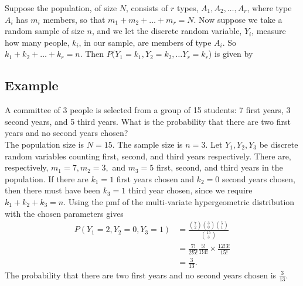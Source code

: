 \noindent Suppose the population, of size $N$, consists of $r$ types, $A_1, A_2,\ldots, A_r$, where type $A_i$ has $m_i$ members, so that $m_1 + m_2 + \ldots + m_r = N$. Now suppose we take a random sample of size $n$, and we let the discrete random variable, $Y_i$, measure how many people, $k_i$, in our sample, are members of type $A_i$. So $k_1 + k_2 + \ldots + k_r = n$. Then $P(Y_1 = k_1, Y_2 = k_2, \ldots Y_r = k_r$) is given by

  	\bigskip
	
	\hfil{}
	\bigskip

\subsection{Example}
A committee of 3 people is selected from a group of 15 students: 7 first years, 3 second years, and 5 third years. What is the probability that there are two first years and no second years chosen? \\

\solution
The population size is $N = 15$. The sample size is $n = 3$. Let $Y_1,Y_2,Y_3$ be discrete random variables counting first, second, and third years respectively. There are, respectively, $m_1 = 7, m_2 = 3,$ and $m_3 = 5$ first, second, and third years in the population. If there are $k_1 = 1$ first years chosen and $k_2 = 0$ second years chosen, then there must have been $k_3 = 1$ third year chosen, since we require $k_1 + k_2 + k_3 = n$. Using the pmf of the multi-variate hypergeometric distribution with the chosen parameters gives
\begin{align*}
P(Y_1 = 2, Y_2 = 0, Y_3 = 1) & = \frac{\binom{7}{2}\binom{3}{0}\binom{5}{1}}{\binom{15}{3}} \\
	& = \frac{7!}{2!5!}\frac{5!}{1!4!}\times\frac{12!3!}{15!} \\
	& = \frac{3}{13}. \tag{cancelling many common factors}
\end{align*}
The probability that there are two first years and no second years chosen is $\frac{3}{13}.$